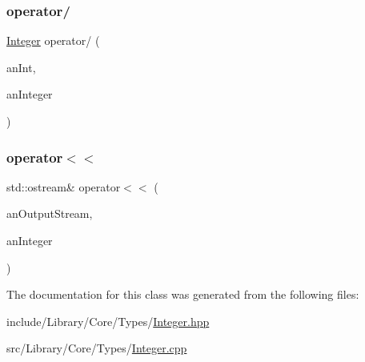 \subsubsection{\texorpdfstring{operator/}{operator/}}
{\footnotesize\ttfamily \mbox{\hyperlink{classlibrary_1_1core_1_1types_1_1_integer}{Integer}} operator/ (\begin{DoxyParamCaption}\item[{const \mbox{\hyperlink{classlibrary_1_1core_1_1types_1_1_integer_a623afb1580f870fd8a1997b1c12c917d}{Integer\+::\+Value\+Type}} \&}]{an\+Int,  }\item[{const \mbox{\hyperlink{classlibrary_1_1core_1_1types_1_1_integer}{Integer}} \&}]{an\+Integer }\end{DoxyParamCaption})\hspace{0.3cm}{\ttfamily [friend]}}

\mbox{\label{classlibrary_1_1core_1_1types_1_1_integer_aec29fc1731201932ab34cfe2ec83fbc9}} 
\subsubsection{\texorpdfstring{operator$<$$<$}{operator<<}}
{\footnotesize\ttfamily std\+::ostream\& operator$<$$<$ (\begin{DoxyParamCaption}\item[{std\+::ostream \&}]{an\+Output\+Stream,  }\item[{const \mbox{\hyperlink{classlibrary_1_1core_1_1types_1_1_integer}{Integer}} \&}]{an\+Integer }\end{DoxyParamCaption})\hspace{0.3cm}{\ttfamily [friend]}}



The documentation for this class was generated from the following files\+:\begin{DoxyCompactItemize}
\item 
include/\+Library/\+Core/\+Types/\mbox{\hyperlink{_integer_8hpp}{Integer.\+hpp}}\item 
src/\+Library/\+Core/\+Types/\mbox{\hyperlink{_integer_8cpp}{Integer.\+cpp}}\end{DoxyCompactItemize}
